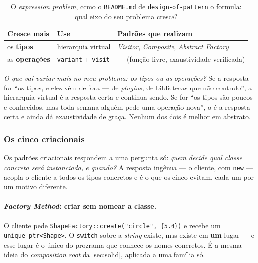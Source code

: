 \begin{table}[htbp]
\centering
\caption{O \emph{expression problem}, como o \texttt{README.md} de
         \texttt{design-of-pattern} o formula: qual eixo do seu problema cresce?}
\label{tab:expression-problem}
\footnotesize
\begin{tabular}{@{}lll@{}}
\toprule
\textbf{Cresce mais} & \textbf{Use} & \textbf{Padrões que realizam} \\
\midrule
os \textbf{tipos}     & hierarquia virtual        & \emph{Visitor}, \emph{Composite}, \emph{Abstract Factory} \\
as \textbf{operações} & \texttt{variant} + \texttt{visit} & --- (função livre, exaustividade verificada) \\
\bottomrule
\end{tabular}
\end{table}

\begin{regra}
\emph{O que vai variar mais no meu problema: os tipos ou as operações?} Se a
resposta for ``os tipos, e eles vêm de fora --- de \emph{plugins}, de
bibliotecas que não controlo'', a hierarquia virtual é a resposta certa e
continua sendo. Se for ``os tipos são poucos e conhecidos, mas toda semana
alguém pede uma operação nova'', o  é a resposta certa e
ainda dá exaustividade de graça. Nenhum dos dois é melhor em abstrato.
\end{regra}

\subsubsection{Os cinco criacionais}

Os padrões criacionais respondem a uma pergunta só: \emph{quem decide qual
classe concreta será instanciada, e quando?} A resposta ingênua --- o cliente,
com \texttt{new} --- acopla o cliente a todos os tipos concretos e é o que os
cinco evitam, cada um por um motivo diferente.

\paragraph{\emph{Factory Method}: criar sem nomear a classe.} O cliente pede
\texttt{ShapeFactory::create("circle", \{5.0\})} e recebe um
\texttt{unique\_ptr<Shape>}. O \texttt{switch} sobre a \emph{string} existe, mas
existe em \textbf{um} lugar --- e esse lugar é o único do programa que conhece
os nomes concretos. É a mesma ideia do \emph{composition root} da
\cref{sec:solid}, aplicada a uma família só.

